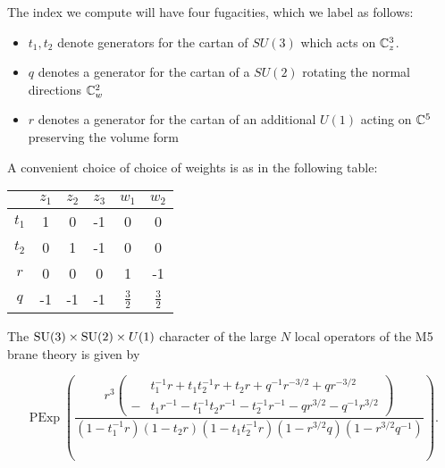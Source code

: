 \documentclass[11pt]{amsart}
\begin{document}
The index we compute will have four fugacities, which we label as follows:
\begin{itemize}
  \item $t_{1}, t_{2}$ denote generators for the cartan of $SU(3)$ which acts on $\mathbb{C}^{3}_{z}$.
  \item $q$ denotes a generator for the cartan of a $SU(2)$ rotating the normal directions $\mathbb{C}^{2}_{w}$
  \item $r$ denotes a generator for the cartan of an additional $U(1)$ acting on $\mathbb{C}^{5}$ preserving the volume form
\end{itemize}

A convenient choice of choice of weights is as in the following table:

\begin{center}
\begin{tabular}{c c c c c c}
  & $z_{1}$ & $z_{2}$ & $z_{3}$ & $w_{1}$ & $w_{2}$ \\
  \hline
  $t_{1}$ & 1 & 0 & -1 & 0 & 0 \\
  $t_{2}$ & 0 & 1 & -1 & 0 & 0 \\
  $r$ & 0 & 0 & 0 & 1 & -1 \\
  $q$ & -1 & -1 & -1 & $\frac{3}{2}$ & $\frac{3}{2}$
\end{tabular}
\end{center}

\begin{prop}
  The $\operatorname{SU}(3)\times \operatorname{SU}(2)\times U(1)$ character of the large $N$ local operators of the M5 brane theory is given by

  \[ \operatorname{PExp} \left (\frac{r^{3}\left (\begin{aligned} & t_{1}^{-1}r+t_{1}t_{2}^{-1}r+t_{2}r+q^{-1}r^{-3/2}+qr^{-3/2} \\  - & t_{1}r^{-1}-t_{1}^{-1}t_{2}r^{-1}-t_{2}^{-1}r^{-1}-qr^{3/2}-q^{-1}r^{3/2}
          \end{aligned}\right)}{(1-t_{1}^{-1}r)(1-t_{2}r)(1-t_{1}t_{2}^{-1}r)(1-r^{3/2}q)(1-r^{3/2}q^{-1})}\right ).\]
  \end{prop}
  
\end{document}
